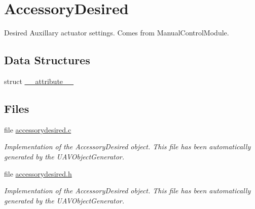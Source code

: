\hypertarget{group___accessory_desired}{\section{\-Accessory\-Desired}
\label{group___accessory_desired}
}


\-Desired \-Auxillary actuator settings. \-Comes from \-Manual\-Control\-Module.  


\subsection*{\-Data \-Structures}
\begin{DoxyCompactItemize}
\item 
struct \hyperlink{struct____attribute____}{\-\_\-\-\_\-attribute\-\_\-\-\_\-}
\end{DoxyCompactItemize}
\subsection*{\-Files}
\begin{DoxyCompactItemize}
\item 
file \hyperlink{accessorydesired_8c}{accessorydesired.\-c}
\begin{DoxyCompactList}\small\item\em \-Implementation of the \-Accessory\-Desired object. \-This file has been automatically generated by the \-U\-A\-V\-Object\-Generator. \end{DoxyCompactList}\item 
file \hyperlink{accessorydesired_8h}{accessorydesired.\-h}
\begin{DoxyCompactList}\small\item\em \-Implementation of the \-Accessory\-Desired object. \-This file has been automatically generated by the \-U\-A\-V\-Object\-Generator. \end{DoxyCompactList}\end{DoxyCompactItemize}
